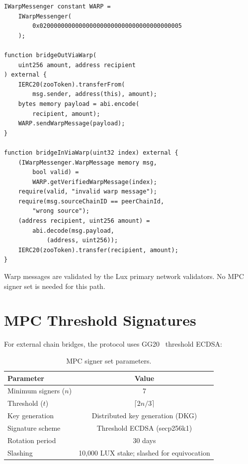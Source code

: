 \documentclass[11pt,letterpaper]{article}
\begin{document}
\begin{lstlisting}[language=Solidity,caption=Warp bridge integration (from ZIP-0022)]
IWarpMessenger constant WARP =
    IWarpMessenger(
        0x0200000000000000000000000000000000000005
    );

function bridgeOutViaWarp(
    uint256 amount, address recipient
) external {
    IERC20(zooToken).transferFrom(
        msg.sender, address(this), amount);
    bytes memory payload = abi.encode(
        recipient, amount);
    WARP.sendWarpMessage(payload);
}

function bridgeInViaWarp(uint32 index) external {
    (IWarpMessenger.WarpMessage memory msg,
        bool valid) =
        WARP.getVerifiedWarpMessage(index);
    require(valid, "invalid warp message");
    require(msg.sourceChainID == peerChainId,
        "wrong source");
    (address recipient, uint256 amount) =
        abi.decode(msg.payload,
            (address, uint256));
    IERC20(zooToken).transfer(recipient, amount);
}
\end{lstlisting}

Warp messages are validated by the Lux primary network validators. No MPC signer set is needed for this path.

\section{MPC Threshold Signatures}
\label{sec:mpc}

For external chain bridges, the protocol uses GG20~\cite{gg20} threshold ECDSA:

\begin{table}[t]
\centering
\begin{tabular}{lc}
\toprule
\textbf{Parameter} & \textbf{Value} \\
\midrule
Minimum signers ($n$) & 7 \\
Threshold ($t$) & $\lceil 2n/3 \rceil$ \\
Key generation & Distributed key generation (DKG) \\
Signature scheme & Threshold ECDSA (secp256k1) \\
Rotation period & 30 days \\
Slashing & 10,000 LUX stake; slashed for equivocation \\
\bottomrule
\end{tabular}
\caption{MPC signer set parameters.}
\label{tab:mpc}
\end{table}
\end{document}
